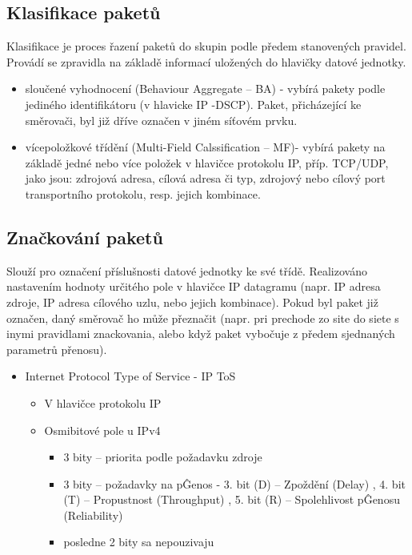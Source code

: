 \subsection{Klasifikace paketů}
Klasifikace je proces řazení paketů do skupin podle předem stanovených pravidel.
Provádí se zpravidla na základě informací uložených do hlavičky datové jednotky.
\begin{itemize}
\item sloučené vyhodnocení (Behaviour Aggregate – BA) - vybírá pakety podle jediného identifikátoru (v hlavicke IP -DSCP). Paket, přicházející ke směrovači, byl již dříve označen v jiném síťovém prvku.
\item vícepoložkové třídění (Multi-Field Calssification – MF)- vybírá pakety na základě jedné nebo více položek v
hlavičce protokolu IP, příp. TCP/UDP, jako jsou: zdrojová adresa, cílová adresa či typ,
zdrojový nebo cílový port transportního protokolu, resp. jejich kombinace.
\end{itemize}

\subsection{Značkování paketů}
Slouží pro označení příslušnosti datové jednotky ke své třídě. Realizováno nastavením
hodnoty určitého pole v hlavičce IP datagramu (napr. IP adresa zdroje, IP adresa cílového uzlu, nebo jejich kombinace).
Pokud byl paket již označen, daný směrovač ho může přeznačit (napr. pri prechode zo site do siete s inymi pravidlami znackovania, alebo když paket vybočuje z předem sjednaných parametrů přenosu).
\begin{itemize}
\item  Internet Protocol Type of Service - IP ToS
\begin{itemize}
\item V hlavičce protokolu IP 
\item Osmibitové pole u IPv4 
    \begin{itemize}
    \item 3 bity – priorita podle požadavku zdroje
    \item 3 bity – požadavky na pĜenos - 3. bit (D) – Zpoždění (Delay) , 4. bit (T) – Propustnost
(Throughput) , 5. bit (R) – Spolehlivost pĜenosu (Reliability) 
    \item posledne 2 bity sa nepouzivaju
    \end{itemize}
\end{itemize}
\end{itemize}

